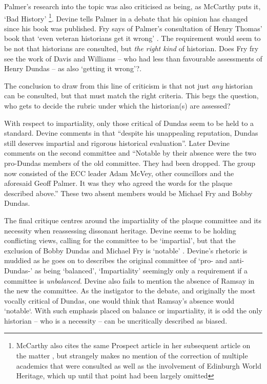 \documentclass{scrartcl}
\renewcommand{\cite}{\parencite}
\begin{document}

Palmer's research into the topic was also criticised as being, as McCarthy puts it, `Bad History' \cite{mccarthy_2022_1} \footnote{McCarthy also cites the same Prospect article \cite{lloyd_2022} in her subsequent article on the matter \cite{mccarthy_2022_2}, but strangely makes no mention of the correction of multiple academics that were consulted as well as the involvement of Edinburgh World Heritage, which up until that point had been largely omitted}. Devine tells Palmer in a debate that his opinion has changed \cite{mackay_2021} since his book \cite{devine_2015} was published. Fry says of Palmer's consultation of Henry Thomas' book \cite{thomas_1997} that `even veteran historians get it wrong' \cite{fry_2020}. The requirement would seem to be not that historians are consulted, but \textit{the right kind} of historian. Does Fry fry see the work of Davis \cite{davis_1975} and Williams \cite{williams_1938} -- who had less than favourable assessments of Henry Dundas -- as also `getting it wrong'?. 

The conclusion to draw from this line of criticism is that not just \textit{any} historian can be consulted, but that must match the right criteria. This begs the question, who gets to decide the rubric under which the historian(s) are assessed?


With respect to impartiality, only those critical of Dundas seem to be held to a standard. Devine comments in \cite{devine_2020} that ``despite his unappealing reputation, Dundas still deserves impartial and rigorous historical evaluation''. Later Devine comments on the second committee and ``Notable by their absence were the two pro-Dundas members of the old committee. They had been dropped. The group now consisted of the ECC leader Adam McVey, other councillors and the aforesaid Geoff Palmer. It was they who agreed the words for the plaque described above.'' These two absent members would be Michael Fry and Bobby Dundas.

The final critique centres around the impartiality of the plaque committee and its necessity when reassessing dissonant heritage.
Devine seems to be holding conflicting views, calling for the committee to be `impartial', but that the exclusion of Bobby Dundas and Michael Fry is `notable' \cite{devine_2020}. Devine's rhetoric is muddied as he goes on to describes the original committee of `pro- and anti-Dundas-' as being `balanced', `Impartiality' seemingly only a requirement if a committee is \textit{unbalanced}. Devine also fails to mention the absence of Ramsay in the new the committee. As the instigator to the debate, and originally the most vocally critical of  Dundas, one would think that Ramsay's absence would `notable`. With such emphasis placed on balance or impartiality, it is odd the only historian -- who is a necessity -- can be uncritically described as biased.
\end{document}
